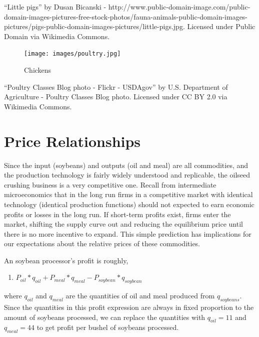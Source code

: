 \documentclass[
  letterpaper,
  DIV=11,
  numbers=noendperiod]{scrreprt}
\providecommand{\tightlist}{%
  \setlength{\itemsep}{0pt}\setlength{\parskip}{0pt}}\usepackage{longtable,booktabs,array}
\begin{document}
``Little pigs'' by Dusan Bicanski -
http://www.public-domain-image.com/public-domain-images-pictures-free-stock-photos/fauna-animals-public-domain-images-pictures/pigs-public-domain-images-pictures/little-pigs.jpg.
Licensed under Public Domain via Wikimedia Commons.

\begin{figure}

{\centering \texttt{[image: images/poultry.jpg]}

}

\caption{Chickens}

\end{figure}

``Poultry Classes Blog photo - Flickr - USDAgov'' by U.S. Department of
Agriculture - Poultry Classes Blog photo. Licensed under CC BY 2.0 via
Wikimedia Commons.

\hypertarget{price-relationships}{%
\section{Price Relationships}\label{price-relationships}}

Since the input (soybeans) and outputs (oil and meal) are all
commodities, and the production technology is fairly widely understood
and replicable, the oilseed crushing business is a very competitive one.
Recall from intermediate microeconomics that in the long run firms in a
competitive market with identical technology (identical production
functions) should not expected to earn economic profits or losses in the
long run. If short-term profits exist, firms enter the market, shifting
the supply curve out and reducing the equilibrium price until there is
no more incentive to expand. This simple prediction has implications for
our expectations about the relative prices of these commodities.

An soybean processor's profit is roughly,

\begin{enumerate}
\def\labelenumi{\arabic{enumi}.}
\tightlist
\item
  \(P_{oil}*q_{oil} + P_{meal}*q_{meal} - P_{soybean}*q_{soybean}\)
\end{enumerate}

where \(q_{oil}\) and \(q_{meal}\) are the quantities of oil and meal
produced from \(q_{soybeans}\). Since the quantities in this profit
expression are always in fixed proportion to the amount of soybeans
processed, we can replace the quantities with \(q_{oil} = 11\) and
\(q_{meal} = 44\) to get profit per bushel of soybeans processed.
\end{document}
